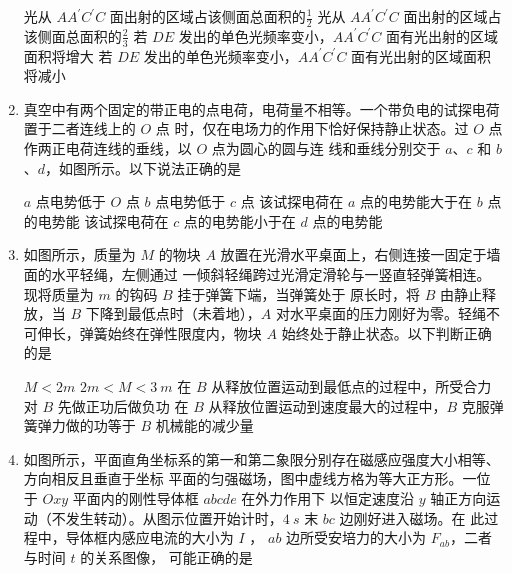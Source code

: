 \begin{enumerate}
\fourchoices
{光从 $ AA ^{\prime} C ^{\prime} C $ 面出射的区域占该侧面总面积的$ \frac{ 1 }{ 2 } $}
{光从 $ AA ^{\prime} C ^{\prime} C $ 面出射的区域占该侧面总面积的$ \frac{ 2 }{ 3 } $}
{若 $ DE $ 发出的单色光频率变小，$ AA ^{\prime} C ^{\prime} C $ 面有光出射的区域面积将增大}
{若 $ DE $ 发出的单色光频率变小，$ AA ^{\prime} C ^{\prime} C $ 面有光出射的区域面积将减小}





\item
真空中有两个固定的带正电的点电荷，电荷量不相等。一个带负电的试探电荷置于二者连线上的 $ O $ 点
时，仅在电场力的作用下恰好保持静止状态。过 $ O $ 点作两正电荷连线的垂线，以 $ O $ 点为圆心的圆与连
线和垂线分别交于 $ a $、$ c $ 和 $ b $、$ d $，如图所示。以下说法正确的是  
\begin{figure}[h!]
\centering

\end{figure}


\fourchoices
{$ a $ 点电势低于 $ O $ 点}
{$ b $ 点电势低于 $ c $ 点}
{该试探电荷在 $ a $ 点的电势能大于在 $ b $ 点的电势能}
{该试探电荷在 $ c $ 点的电势能小于在 $ d $ 点的电势能}






\item
如图所示，质量为 $ M $ 的物块 $ A $ 放置在光滑水平桌面上，右侧连接一固定于墙面的水平轻绳，左侧通过
一倾斜轻绳跨过光滑定滑轮与一竖直轻弹簧相连。现将质量为 $ m $ 的钩码 $ B $ 挂于弹簧下端，当弹簧处于
原长时，将 $ B $ 由静止释放，当 $ B $ 下降到最低点时（未着地），$ A $ 对水平桌面的压力刚好为零。轻绳不
可伸长，弹簧始终在弹性限度内，物块 $ A $ 始终处于静止状态。以下判断正确的是  
\begin{figure}[h!]
\centering

\end{figure}


\fourchoices
{$ M<2m $}
{$ 2m<M<3 \ m $}
{在 $ B $ 从释放位置运动到最低点的过程中，所受合力对 $ B $ 先做正功后做负功}
{在 $ B $ 从释放位置运动到速度最大的过程中，$ B $ 克服弹簧弹力做的功等于 $ B $ 机械能的减少量}






\item 
如图所示，平面直角坐标系的第一和第二象限分别存在磁感应强度大小相等、方向相反且垂直于坐标
平面的匀强磁场，图中虚线方格为等大正方形。一位于 $ Oxy $ 平面内的刚性导体框 $ abcde $ 在外力作用下
以恒定速度沿 $ y $ 轴正方向运动（不发生转动）。从图示位置开始计时，$ 4 \ s $ 末 $ bc $ 边刚好进入磁场。在
此过程中，导体框内感应电流的大小为 $ I $ ， $ ab $ 边所受安培力的大小为 $ F_{ab} $，二者与时间 $ t $ 的关系图像，
可能正确的是  
\begin{figure}[h!]
\centering

\end{figure}


\end{enumerate}
